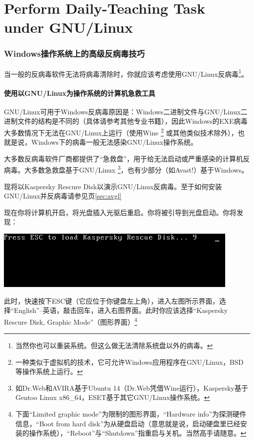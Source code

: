\part{Perform Daily-Teaching Task under GNU/Linux}
\section{Windows操作系统上的高级反病毒技巧}
当一般的反病毒软件无法将病毒清除时，你就应该考虑使用GNU/Linux反病毒\footnote{当然你也可以重装系统。但这么做无法清除系统盘以外的病毒。}。
\subsection{使用以GNU/Linux为操作系统的计算机急救工具}
GNU/Linux可用于Windows反病毒原因是：Windows二进制文件与GNU/Linux二进制文件的结构是不同的（具体请参考其他专业书籍），因此Windows的EXE病毒大多数情况下无法在GNU/Linux上运行（使用Wine \footnote{一种类似于虚拟机的技术，它可允许Windows应用程序在GNU/Linux，BSD等操作系统上运行。} 或其他类似技术除外），也就是说，Windows下的病毒一般无法感染GNU/Linux操作系统。\par
大多数反病毒软件厂商都提供了“急救盘”，用于给无法启动或严重感染的计算机反病毒。大多数急救盘基于GNU/Linux \footnote{如Dr.Web和AVIRA基于Ubuntu 14（Dr.Web凭借Wine运行），Kaspersky基于Gentoo Linux x86\_64，ESET基于其它GNU/Linux操作系统。}，也有少部分（如Avast!）基于Windows。\par
现将以Kaspersky Rescure Disk以演示GNU/Linux反病毒。至于如何安装GNU/Linux并反病毒请参见\pageref{sec:avgl}页\ref{sec:avgl}\par
现在你将计算机开启，将光盘插入光驱后重启。你将被引导到光盘启动。你将发现：
\begin{center}
	\includegraphics[scale=0.7]{pic/krd1}
\end{center} \par
此时，快速按下ESC键（它应位于你键盘左上角），进入左图所示界面，选择“English”--英语，敲击回车，进入右图界面。此时你应该选择“Kaspersky Rescure Disk, Graphic Mode”（图形界面）\footnote{下面“Limited graphic mode”为限制的图形界面，“Hardware info”为探测硬件信息，“Boot from hard disk”为从硬盘启动（意思就是说，启动硬盘里已经安装的操作系统），“Reboot”与“Shutdown”指重启与关机。当然高手请随意。}
